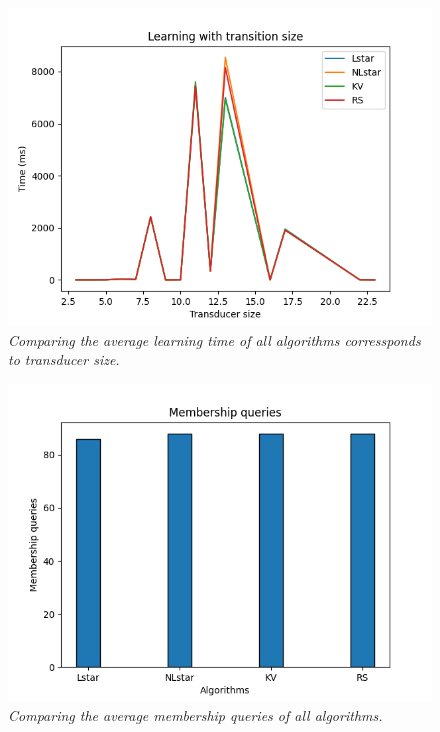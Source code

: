 \begin{figure}[h]
    \centering
    \includegraphics[scale=0.75]{figures/transition_size.png}
    \caption{\textit{Comparing the average learning time of all algorithms corressponds to transducer size.}}
    \label{fig:transition_size}
\end{figure}

\begin{figure}[h]
    \centering
    \includegraphics[scale=0.75]{figures/average_membership.png}
    \caption{\textit{Comparing the average membership queries of all algorithms.}}
    \label{fig:average_membership}
\end{figure}